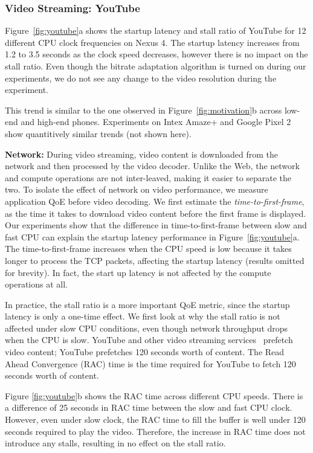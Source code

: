 \subsubsection{Video Streaming: YouTube}

Figure~\ref{fig:youtube}a shows the startup latency and stall ratio of YouTube for 12 different CPU clock frequencies on Nexus 4. 
The startup latency increases from 1.2 to 3.5 seconds as the clock speed decreases, however 
there is no impact on the stall ratio. Even though the bitrate adaptation algorithm is turned on during our experiments, we do not see any change to the video resolution during the experiment.

This trend is similar to the one observed in Figure~\ref{fig:motivation}b across low-end and high-end phones. Experiments on Intex Amaze+ and Google Pixel 2 show quantitively similar trends (not shown here).


\noindent \textbf{Network:} During video streaming, video content is downloaded from the network and then processed by the video decoder. Unlike the Web, the network and compute operations are not inter-leaved, making it easier to separate the two. To isolate the effect of network on video performance, we measure application QoE before video decoding. We first estimate the {\em time-to-first-frame}, as the time it takes to download video content before the first frame is displayed. Our experiments show that the difference in time-to-first-frame between slow and fast CPU can explain the startup latency performance in Figure~\ref{fig:youtube}a. The time-to-first-frame increases when the CPU speed is low because it takes longer to process the TCP packets, affecting the startup latency (results omitted for brevity). In fact, the start up latency is not affected by the compute operations at all.

In practice, the stall ratio is a more important QoE metric, since the startup latency is only a one-time effect. We first look at why the stall ratio is not affected under slow CPU conditions, even though network throughput drops when the CPU is slow. YouTube and other video streaming services~\cite{netflix,hbogo} prefetch video content; YouTube prefetches 120 seconds worth of content. The Read Ahead Convergence (RAC) time is the time required for YouTube to fetch  120 seconds worth of content. 

Figure \ref{fig:youtube}b shows the RAC time across different CPU speeds.  There is a difference of 25 seconds in RAC time between the slow and fast CPU clock. However, even under slow clock, the RAC time to fill the buffer is well under 120 seconds required to play the video. Therefore, the increase in RAC time does not introduce any stalls, resulting in no effect on the stall ratio.  %




